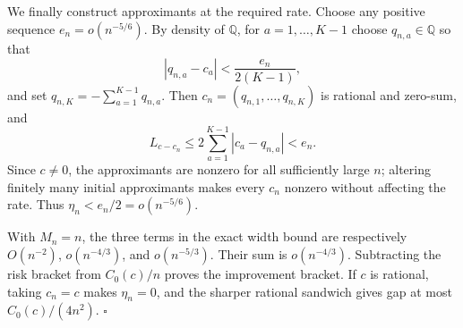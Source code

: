 We finally construct approximants at the required rate.  Choose any positive sequence \(e_n=o(n^{-5/6})\).  By density of \(\mathbb Q\), for \(a=1,\ldots,K-1\) choose \(q_{n,a}\in\mathbb Q\) so that
\[
 |q_{n,a}-c_a|<\frac{e_n}{2(K-1)},
\]
and set \(q_{n,K}=-\sum_{a=1}^{K-1}q_{n,a}\).  Then \(c_n=(q_{n,1},\ldots,q_{n,K})\) is rational and zero-sum, and
\[
 L_{c-c_n}\leq2\sum_{a=1}^{K-1}|c_a-q_{n,a}|<e_n.
\]
Since \(c\neq0\), the approximants are nonzero for all sufficiently large \(n\); altering finitely many initial approximants makes every \(c_n\) nonzero without affecting the rate.  Thus \(\eta_n<e_n/2=o(n^{-5/6})\).

With \(M_n=n\), the three terms in the exact width bound are respectively \(O(n^{-2})\), \(o(n^{-4/3})\), and \(o(n^{-5/3})\).  Their sum is \(o(n^{-4/3})\).  Subtracting the risk bracket from \(C_0(c)/n\) proves the improvement bracket.  If \(c\) is rational, taking \(c_n=c\) makes \(\eta_n=0\), and the sharper rational sandwich gives gap at most \(C_0(c)/(4n^2)\). \(\square\)